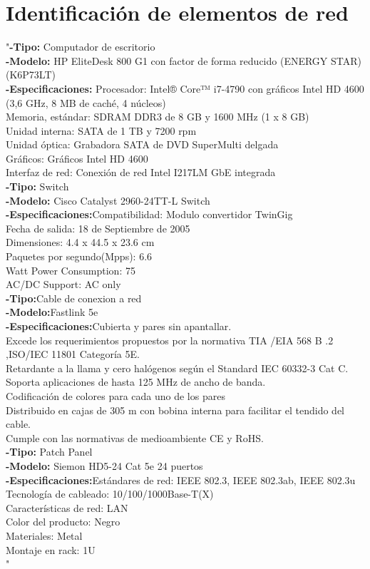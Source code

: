 \documentclass{udpreport}
\begin{document}
\section{Identificación de elementos de red}
"{\bf-Tipo:} Computador de escritorio\\
{\bf-Modelo:}  HP EliteDesk 800 G1 con factor de forma reducido (ENERGY STAR)
(K6P73LT)\\
{\bf-Especificaciones:} Procesador:
Intel® Core™ i7-4790 con gráficos Intel HD 4600 (3,6 GHz, 8 MB de caché, 4 núcleos)\\
Memoria, estándar:
SDRAM DDR3 de 8 GB y 1600 MHz (1 x 8 GB)\\
Unidad interna:
SATA de 1 TB y 7200 rpm\\
Unidad óptica:
Grabadora SATA de DVD SuperMulti delgada\\
Gráficos:
Gráficos Intel HD 4600\\
Interfaz de red:
Conexión de red Intel I217LM GbE integrada\\
{\bf-Tipo:} Switch\\
{\bf-Modelo:} Cisco Catalyst 2960-24TT-L Switch\\
{\bf-Especificaciones:}Compatibilidad:
Modulo convertidor TwinGig\\
Fecha de salida:
18 de Septiembre de 2005\\
Dimensiones:
4.4 x 44.5 x 23.6 cm\\
Paquetes por segundo(Mpps):
6.6\\
Watt Power Consumption:	
75\\
AC/DC Support:
AC only\\
{\bf-Tipo:}Cable de conexion a red\\
{\bf-Modelo:}Fastlink 5e\\
{\bf-Especificaciones:}Cubierta y pares sin apantallar.\\
Excede los requerimientos propuestos por la normativa TIA /EIA 568 B .2 ,ISO/IEC 11801 Categoría 5E.\\
Retardante a la llama y cero halógenos según el Standard IEC 60332-3 Cat C.\\
Soporta aplicaciones de hasta 125 MHz de ancho de banda.\\
Codificación de colores para cada uno de los pares\\
Distribuido en cajas de 305 m con bobina interna para facilitar el tendido del cable.\\
Cumple con las normativas de medioambiente CE y RoHS.\\
{\bf-Tipo:} Patch Panel\\
{\bf-Modelo:} Siemon HD5-24 Cat 5e 24 puertos\\
{\bf-Especificaciones:}Estándares de red: IEEE 802.3, IEEE 802.3ab, IEEE 802.3u\\
Tecnología de cableado: 10/100/1000Base-T(X)\\
Características de red: LAN\\
Color del producto: Negro\\
Materiales: Metal\\
Montaje en rack: 1U\\"
\end{document}

